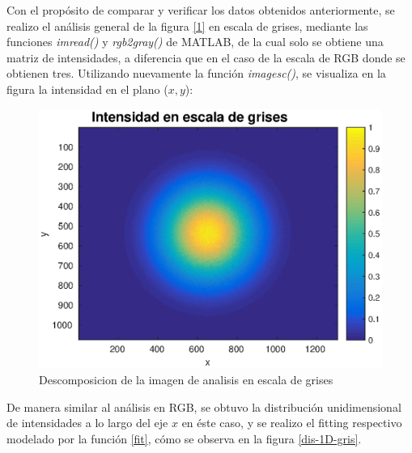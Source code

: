 \documentclass[11pt,letterpaper,twocolumn]{article}
\begin{document}
\par 
Con el propósito de comparar y verificar los datos obtenidos anteriormente, se realizo el análisis general de la figura \ref{1} en escala de grises, mediante las funciones \textit{imread()} y \textit{rgb2gray()} de MATLAB, de la cual solo se obtiene una matriz de intensidades, a diferencia que en el caso de la escala de RGB donde se obtienen tres. Utilizando nuevamente la función \textit{imagesc()}, se visualiza en la figura la intensidad en el plano ($x,y$):\\   
\begin{figure}[h!]
\begin{center}
\includegraphics[scale=0.6]{gris.eps}
\caption{Descomposicion de la imagen de analisis en escala de grises}
\end{center}
\end{figure}
\par 
De manera similar al análisis en RGB, se obtuvo la distribución unidimensional de intensidades a lo largo del eje $x$ en éste caso, y se realizo el fitting respectivo modelado por la función \ref{fit}, cómo se observa en la figura \ref{dis-1D-gris}.\\ 
\end{document}
